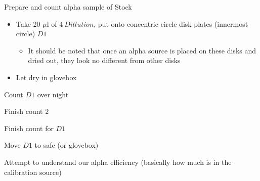 \documentclass[idxtotoc,hyperref,openany,oneside]{labbook} %
\newcommand{\cmark}{\ding{51}}%
\newcommand{\done}{\rlap{$\square$}{\raisebox{2pt}{\large\hspace{1pt}\cmark}}%
  \hspace{-2.5pt}}
\begin{document}
\begin{todolist}
\item[\done]{Prepare and count alpha sample of Stock}
  \begin{itemize}
  \item{Take 20 $\mu$l of $\boxed{4\ Dillution}$, put onto
  concentric circle disk plates (innermost circle) $\boxed{D1}$}
    \begin{itemize}
    \item{It should be noted that once an alpha source is
      placed on these disks and dried out, they look no different
      from other disks}
    \end{itemize}
  \item{Let dry in glovebox}
  \end{itemize}
\item[\done]{Count $\boxed{D1}$ over night}
\end{todolist}




\begin{todolist}
\item[\done]{Finish count $\boxed{2}$}
\end{todolist}

\begin{todolist}
\item[\done]{Finish count for $\boxed{D1}$}
\item[\done]{Move $\boxed{D1}$ to safe (or glovebox)}
\end{todolist}

\begin{todolist}
\item{Attempt to understand our alpha efficiency (basically
  how much is in the calibration source)}
\end{todolist}


\end{document}
